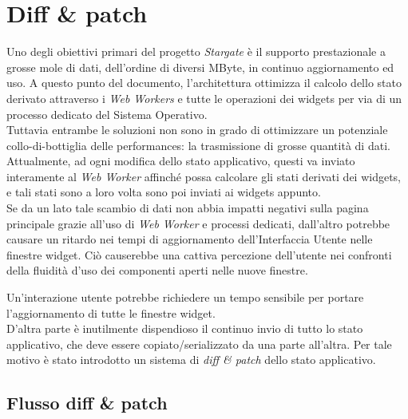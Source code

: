 
\chapter{Diff \& patch}
\label{cap:diff-patch}

Uno degli obiettivi primari del progetto \textit{Stargate} è il supporto prestazionale a grosse mole di dati, dell'ordine di diversi MByte, in continuo aggiornamento ed uso. A questo punto del documento, l'architettura ottimizza il calcolo dello stato derivato attraverso i \textit{Web Workers} e tutte le operazioni dei widgets per via di un processo dedicato del Sistema Operativo. \\

Tuttavia entrambe le soluzioni non sono in grado di ottimizzare un potenziale collo-di-bottiglia delle performances: la trasmissione di grosse quantità di dati. Attualmente, ad ogni modifica dello stato applicativo, questi va inviato interamente al \textit{Web Worker} affinché possa calcolare gli stati derivati dei widgets, e tali stati sono a loro volta sono poi inviati ai widgets appunto. \\

Se da un lato tale scambio di dati non abbia impatti negativi sulla pagina principale grazie all'uso di \textit{Web Worker} e processi dedicati, dall'altro potrebbe causare un ritardo nei tempi di aggiornamento dell'Interfaccia Utente nelle finestre widget. Ciò causerebbe una cattiva percezione dell'utente nei confronti della fluidità d'uso dei componenti aperti nelle nuove finestre.

Un'interazione utente potrebbe richiedere un tempo sensibile per portare l'aggiornamento di tutte le finestre widget. \\

D'altra parte è inutilmente dispendioso il continuo invio di tutto lo stato applicativo, che deve essere copiato/serializzato da una parte all'altra. Per tale motivo è stato introdotto un sistema di \textit{diff \& patch} dello stato applicativo.

\section{Flusso diff \& patch}

